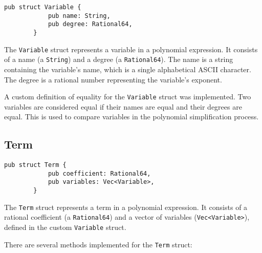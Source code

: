 \begin{minipage}{\linewidth}
    \begin{lstlisting}[caption={The \texttt{Variable} struct}, label={lst:variable}]
        pub struct Variable {
            pub name: String,
            pub degree: Rational64,
        }
    \end{lstlisting}
\end{minipage}

The \verb|Variable| struct represents a variable in a polynomial expression. It consists of a name (a \verb|String|) and a degree (a \verb|Rational64|). The name is a string containing the variable's name, which is a single alphabetical ASCII character. The degree is a rational number representing the variable's exponent.

A custom definition of equality for the \verb|Variable| struct was implemented. Two variables are considered equal if their names are equal and their degrees are equal. This is used to compare variables in the polynomial simplification process.

\subsection{Term}\label{subsec:term}

\begin{minipage}{\linewidth}
    \begin{lstlisting}[caption={The \texttt{Term} struct}, label={lst:term}]
        pub struct Term {
            pub coefficient: Rational64,
            pub variables: Vec<Variable>,
        }    
    \end{lstlisting}
\end{minipage}

The \verb|Term| struct represents a term in a polynomial expression. It consists of a rational coefficient (a \verb|Rational64|) and a vector of variables (\verb|Vec<Variable>|), defined in the custom \texttt{Variable} struct.

There are several methods implemented for the \verb|Term| struct:


